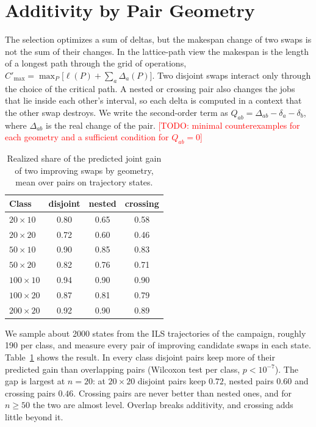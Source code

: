\documentclass{article}
\newcommand{\todo}[1]{\textcolor{red}{[TODO: #1]}}
\begin{document}
\section{Additivity by Pair Geometry}\label{sec:additivity}

The selection optimizes a sum of deltas, but the makespan change of two
swaps is not the sum of their changes. In the lattice-path view the
makespan is the length of a longest path through the grid of operations,
$C'_{\max}=\max_P\bigl[\ell(P)+\sum_a\Delta_a(P)\bigr]$. Two disjoint
swaps interact only through the choice of the critical path. A nested or
crossing pair also changes the jobs that lie inside each other's
interval, so each delta is computed in a context that the other swap
destroys. We write the second-order term as
$Q_{ab}=\Delta_{ab}-\delta_a-\delta_b$, where $\Delta_{ab}$ is the real
change of the pair. \todo{minimal counterexamples for each geometry and
a sufficient condition for $Q_{ab}=0$}

\begin{table}[t]
\centering
\caption{Realized share of the predicted joint gain of two improving
swaps by geometry, mean over pairs on trajectory states.}
\label{tab:geometry}
\small
\begin{tabular}{@{}lccc@{}}
\toprule
Class & disjoint & nested & crossing \\
\midrule
$20\times10$ & 0.80 & 0.65 & 0.58 \\
$20\times20$ & 0.72 & 0.60 & 0.46 \\
$50\times10$ & 0.90 & 0.85 & 0.83 \\
$50\times20$ & 0.82 & 0.76 & 0.71 \\
$100\times10$ & 0.94 & 0.90 & 0.90 \\
$100\times20$ & 0.87 & 0.81 & 0.79 \\
$200\times20$ & 0.92 & 0.90 & 0.89 \\
\bottomrule
\end{tabular}
\end{table}

We sample about 2000 states from the ILS trajectories of the campaign,
roughly 190 per class, and measure every pair of improving candidate
swaps in each state. Table~\ref{tab:geometry} shows the result. In every
class disjoint pairs keep more of their predicted gain than overlapping
pairs (Wilcoxon test per class, $p<10^{-7}$). The gap is largest at
$n=20$: at $20\times20$ disjoint pairs keep $0.72$, nested pairs $0.60$
and crossing pairs $0.46$. Crossing pairs are never better than nested
ones, and for $n\geq50$ the two are almost level. Overlap breaks
additivity, and crossing adds little beyond it.
\end{document}
